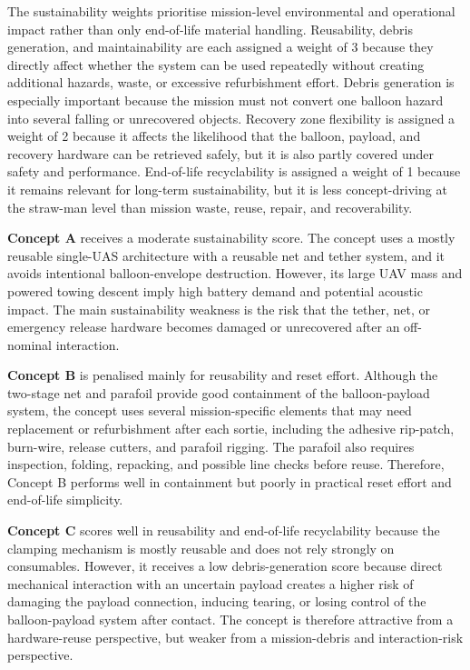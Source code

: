 The sustainability weights prioritise mission-level environmental and operational impact rather than only end-of-life material handling. Reusability, debris generation, and maintainability are each assigned a weight of 3 because they directly affect whether the system can be used repeatedly without creating additional hazards, waste, or excessive refurbishment effort. Debris generation is especially important because the mission must not convert one balloon hazard into several falling or unrecovered objects. Recovery zone flexibility is assigned a weight of 2 because it affects the likelihood that the balloon, payload, and recovery hardware can be retrieved safely, but it is also partly covered under safety and performance. End-of-life recyclability is assigned a weight of 1 because it remains relevant for long-term sustainability, but it is less concept-driving at the straw-man level than mission waste, reuse, repair, and recoverability.

\textbf{Concept A} receives a moderate sustainability score. The concept uses a mostly reusable single-UAS architecture with a reusable net and tether system, and it avoids intentional balloon-envelope destruction. However, its large UAV mass and powered towing descent imply high battery demand and potential acoustic impact. The main sustainability weakness is the risk that the tether, net, or emergency release hardware becomes damaged or unrecovered after an off-nominal interaction.

\textbf{Concept B} is penalised mainly for reusability and reset effort. Although the two-stage net and parafoil provide good containment of the balloon-payload system, the concept uses several mission-specific elements that may need replacement or refurbishment after each sortie, including the adhesive rip-patch, burn-wire, release cutters, and parafoil rigging. The parafoil also requires inspection, folding, repacking, and possible line checks before reuse. Therefore, Concept B performs well in containment but poorly in practical reset effort and end-of-life simplicity.

\textbf{Concept C} scores well in reusability and end-of-life recyclability because the clamping mechanism is mostly reusable and does not rely strongly on consumables. However, it receives a low debris-generation score because direct mechanical interaction with an uncertain payload creates a higher risk of damaging the payload connection, inducing tearing, or losing control of the balloon-payload system after contact. The concept is therefore attractive from a hardware-reuse perspective, but weaker from a mission-debris and interaction-risk perspective.

